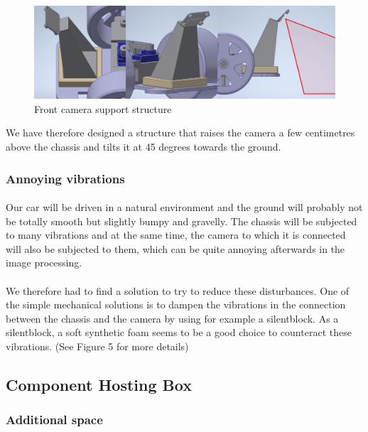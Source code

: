 \begin{figure}[!ht]
    \begin{center}
        \includegraphics[scale=0.58]{Images/camera_support.jpg}
    \end{center}
    \caption{Front camera support structure}
    \label{fig:raspi_config}
\end{figure}

We have therefore designed a structure that raises the camera a few centimetres
above the chassis and tilts it at 45 degrees towards the ground. 

\subsubsection{Annoying vibrations}
\paragraph{}
Our car will be driven in a natural environment and the ground will probably
not be totally smooth but slightly bumpy and gravelly. The chassis will be
subjected to many vibrations and at the same time, the camera to which it is
connected will also be subjected to them, which can be quite annoying
afterwards in the image processing.

\paragraph{}
We therefore had to find a solution to try to reduce these disturbances.
One of the simple mechanical solutions is to dampen the vibrations in the
connection between the chassis and the camera by using for example a silentblock.
As a silentblock, a soft synthetic foam seems to be a good choice to counteract
these vibrations. (See Figure 5 for more details)

\subsection{Component Hosting Box}

\subsubsection{Additional space}
